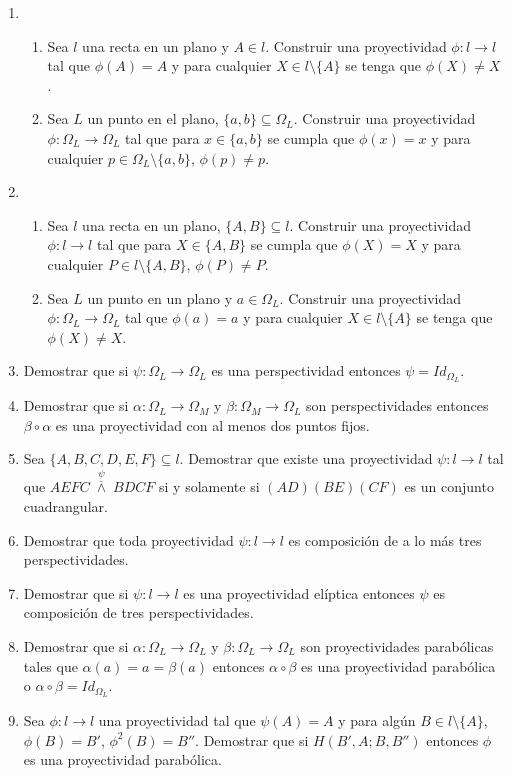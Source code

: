 \documentclass[12pt]{report}
\numberwithin{section}{chapter}
\begin{document}
\begin{enumerate}
\item 
\begin{enumerate}
\item Sea $l$ una recta en un plano y $A \in l$. Construir una proyectividad $\phi:l \to l$ tal que $\phi(A)=A$ y para cualquier $X \in l\setminus\{A\}$ se tenga que $\phi(X) \neq X$.
\item Sea $L$ un punto en el plano, $\{a,b\} \subseteq \Omega_L$. Construir una proyectividad $\phi:\Omega_L \to \Omega_L$ tal que para $x \in \{a,b\}$ se cumpla que $\phi(x)=x$ y para cualquier $p \in \Omega_L \setminus\{a,b\}$, $\phi(p) \neq p$.
\end{enumerate}

\item 
\begin{enumerate}
\item Sea $l$ una recta en un plano, $\{A,B\} \subseteq l$. Construir una proyectividad $\phi:l \to l$ tal que para $X \in \{A,B\}$ se cumpla que $\phi(X)=X$ y para cualquier $P \in l \setminus\{A,B\}$, $\phi(P) \neq P$.
\item Sea $L$ un punto en un plano y $a \in \Omega_L$. Construir una proyectividad $\phi:\Omega_L\to \Omega_L$ tal que $\phi(a)=a$ y para cualquier $X \in l\setminus\{A\}$ se tenga que $\phi(X) \neq X$.
\end{enumerate}

\item Demostrar que si $\psi: \Omega_L \to \Omega_L$ es una perspectividad entonces $\psi= Id_{\Omega_L}$. 

\item Demostrar que si $\alpha: \Omega_L \to \Omega_M$ y $\beta: \Omega_M \to \Omega_L$ son perspectividades entonces $\beta \circ \alpha$ es una proyectividad con al menos dos puntos fijos.

\item Sea $\{A,B,C,D,E,F\} \subseteq l$. Demostrar que existe una proyectividad $\psi:l \to l$ tal que \linebreak $AEFC\;\overset{\psi}{\overline{\wedge}}\; BDCF$ si y solamente si $(AD)(BE)(CF)$ es un conjunto cuadrangular.

\item Demostrar que toda proyectividad $\psi:l \to l$ es composición de a lo más tres perspectividades.

\item Demostrar que si $\psi:l \to l$ es una proyectividad elíptica entonces $\psi$ es composición de tres perspectividades.

\item Demostrar que si $\alpha: \Omega_L \to \Omega_L$ y $\beta:\Omega_L \to \Omega_L$ son  proyectividades parabólicas tales que $\alpha(a)=a=\beta(a)$ entonces $\alpha \circ \beta$ es una proyectividad parabólica o $\alpha \circ \beta = Id_{\Omega_L}$.

\item Sea $\phi:l \to l$ una proyectividad tal que $\psi(A)=A$ y para algún $B \in l\setminus\{A\}$, $\phi(B)=B'$, $\phi^2(B)=B''$. Demostrar que si $H(B',A;B,B'')$ entonces $\phi$ es una proyectividad parabólica.

\end{enumerate}
\end{document}
